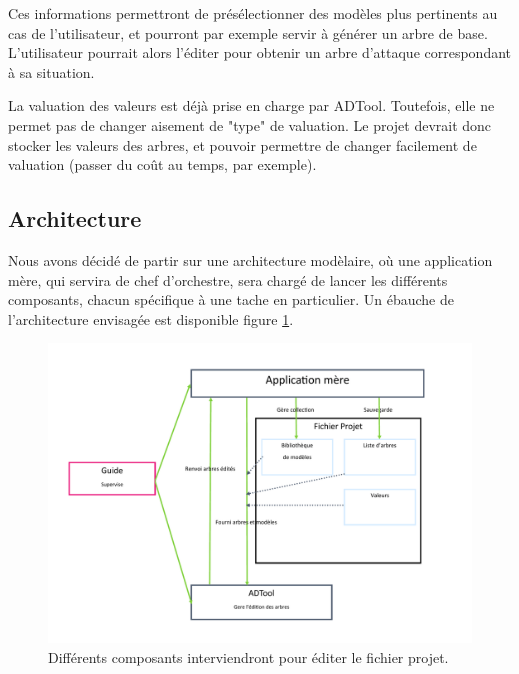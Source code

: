         Ces informations permettront de présélectionner des modèles plus pertinents au cas de l'utilisateur, et pourront par exemple servir à générer un arbre de base. L'utilisateur pourrait alors l'éditer pour obtenir un arbre d'attaque correspondant à sa situation.

        La valuation des valeurs est déjà prise en charge par ADTool. Toutefois, elle ne permet pas de changer aisement de "type" de valuation. Le projet devrait donc stocker les valeurs des arbres, et pouvoir permettre de changer facilement de valuation (passer du coût au temps, par exemple).
    
    \subsection{Architecture}
        Nous avons décidé de partir sur une architecture modèlaire, où une application mère, qui servira de chef d'orchestre, sera chargé de lancer les différents composants, chacun spécifique à une tache en particulier. %
        Un ébauche de l'architecture envisagée est disponible figure \ref{fig:archi}.

        \begin{figure}
            \begin{center}
                \includegraphics[width=1\textwidth]{figure/archi.pdf}
            \end{center}
            \caption{Différents composants interviendront pour éditer le fichier projet.}
            \label{fig:archi}
        \end{figure}

